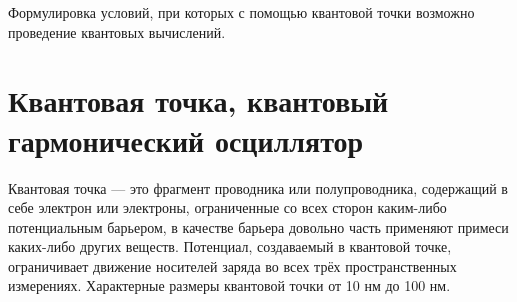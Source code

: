 \documentclass[14pt,a4paper]{PhDthesis}
\begin{document}
Формулировка условий, при которых с помощью квантовой точки возможно проведение квантовых вычислений.

\section{Квантовая точка, квантовый гармонический осциллятор}

Квантовая точка --- это фрагмент проводника или полупроводника, содержащий в себе электрон или электроны, ограниченные со всех сторон каким-либо потенциальным барьером, в качестве барьера довольно часть применяют примеси каких-либо других веществ. Потенциал, создаваемый в квантовой точке,
ограничивает движение носителей заряда во всех трёх пространственных измерениях. Характерные размеры квантовой точки от 10 нм до 100 нм.
\end{document}
